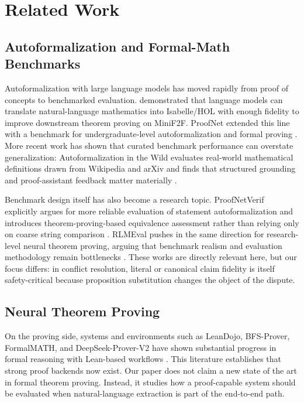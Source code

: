 \documentclass[11pt]{article}
\begin{document}
\section{Related Work}

\subsection{Autoformalization and Formal-Math Benchmarks}

Autoformalization with large language models has moved rapidly from proof of
concepts to benchmarked evaluation. \citet{wu2022autoformalization}
demonstrated that language models can translate natural-language mathematics
into Isabelle/HOL with enough fidelity to improve downstream theorem proving on
MiniF2F. ProofNet extended this line with a benchmark for undergraduate-level
autoformalization and formal proving \citep{azerbayev2023proofnet}. More
recent work has shown that curated benchmark performance can overstate
generalization: Autoformalization in the Wild evaluates real-world mathematical
definitions drawn from Wikipedia and arXiv and finds that structured grounding
and proof-assistant feedback matter materially \citep{zhang2025wild}.

Benchmark design itself has also become a research topic. ProofNetVerif
explicitly argues for more reliable evaluation of statement autoformalization
and introduces theorem-proving-based equivalence assessment rather than relying
only on coarse string comparison \citep{poiroux2025reliable}. RLMEval pushes in
the same direction for research-level neural theorem proving, arguing that
benchmark realism and evaluation methodology remain bottlenecks
\citep{poiroux2025rlmeval}. These works are directly relevant here, but our
focus differs: in conflict resolution, literal or canonical claim fidelity is
itself safety-critical because proposition substitution changes the object of
the dispute.

\subsection{Neural Theorem Proving}

On the proving side, systems and environments such as LeanDojo, BFS-Prover,
FormalMATH, and DeepSeek-Prover-V2 have shown substantial progress in formal
reasoning with Lean-based workflows \citep{yang2023leandojo,hsieh2025bfs,
yu2025formalmath,ren2025deepseek}. This literature establishes that strong
proof backends now exist. Our paper does not claim a new state of the art in
formal theorem proving. Instead, it studies how a proof-capable system should
be evaluated when natural-language extraction is part of the end-to-end path.
\end{document}
